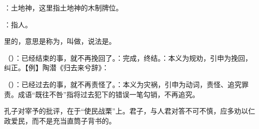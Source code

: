 {
\begin{lyitemize}
\item {}：土地神，这里指土地神的木制牌位。
\item {}：指人。
\item {}里的，意思是称为，叫做，说法是。
\item {}（）：已经结束的事，就不再挽回了。：完成，终结。：本义为规劝，引申为挽回，纠正。【例】陶潜《归去来兮辞》：
\item {}（）：已经过去的事，就不再责怪了。：本义为灾祸，引申为动词，责怪、追究罪责。成语“既往不咎”指将过去犯下的错误一笔勾销，不再追究。
\end{lyitemize}
孔子对宰予的批评，在于“使民战栗”上。君子，与人君对答不可不慎，应多劝以仁政爱民，而不是充当直筒子背书的。
}
{}


